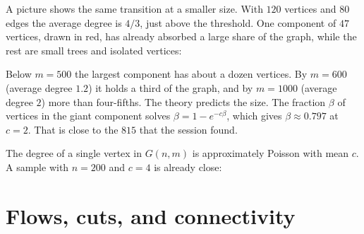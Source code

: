 \begin{codepairs}
\end{codepairs}

A picture shows the same transition at a smaller size. With \(120\) vertices and
\(80\) edges the average degree is \(4/3\), just above the threshold. One
component of \(47\) vertices, drawn in red, has already absorbed a large share
of the graph, while the rest are small trees and isolated vertices:



Below \(m = 500\) the largest component has about a dozen vertices. By
\(m = 600\) (average degree \(1.2\)) it holds a third of the graph, and by
\(m = 1000\) (average degree \(2\)) more than four-fifths. The theory predicts
the size. The fraction \(\beta\) of vertices in the giant component solves
\(\beta = 1 - e^{-c\beta}\), which gives \(\beta \approx 0.797\) at \(c = 2\).
That is close to the \(815\) that the session found.

The degree of a single vertex in \(G(n,m)\) is approximately Poisson with mean
\(c\). A sample with \(n = 200\) and \(c = 4\) is already close:

\begin{codepairs}
\end{codepairs}


\section{Flows, cuts, and connectivity}
\label{sec:graphs-flows}

